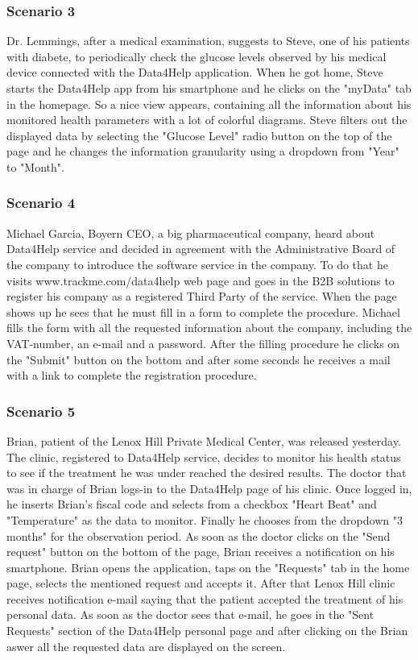 \subsubsection{Scenario 3}
Dr. Lemmings, after a medical examination, suggests to Steve, one of his patients with diabete, to periodically check the glucose levels observed by his medical device connected with the Data4Help application. 
When he got home, Steve starts the Data4Help app from his smartphone and he clicks on the "myData" tab in the homepage. So a nice view appears, containing all the information about his monitored health parameters with a lot of colorful diagrams. Steve filters out the displayed data by selecting the "Glucose Level" radio button on the top of the page and he changes the information granularity using a dropdown from "Year" to  "Month". 
\subsubsection{Scenario 4}
Michael Garcia, Boyern CEO, a big pharmaceutical company, heard about Data4Help service and decided in agreement with the Administrative Board of the company to introduce the software service in the company. To do that he visits  www.trackme.com/data4help web page and goes in the B2B solutions to register his company as a registered Third Party of the service. When the page shows up he sees that he must fill in a form to complete the procedure. 
Michael fills the form with all the requested information about the company, including the VAT-number, an e-mail and a password. After the filling procedure he clicks on the "Submit" button on the bottom and after some seconds he receives a mail with a link to complete the registration procedure.
\subsubsection{Scenario 5}
Brian, patient of the Lenox Hill Private Medical Center, was released  yesterday.  The clinic, registered to Data4Help service, decides to monitor his health status to see if the treatment he was under reached the desired results.
The doctor that was in charge of Brian logs-in to the Data4Help page of his clinic. Once logged in, he inserts Brian's fiscal code and selects from a checkbox "Heart Beat" and "Temperature" as the data to monitor. Finally he chooses from the dropdown  "3 months" for the observation period.
As soon as the doctor clicks on the "Send request" button on the bottom of the page, Brian receives a notification on his smartphone. Brian opens the application, taps on the "Requests" tab in the home page, selects the mentioned request and accepts it. After that Lenox Hill clinic receives notification e-mail saying that the patient accepted the treatment of his personal data. As soon as the doctor sees that e-mail, he goes in the "Sent Requests" section of the Data4Help personal page and after clicking on the Brian aswer all the requested data are displayed on the screen.
